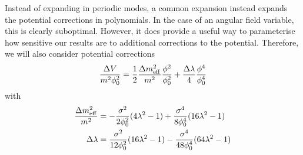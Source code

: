 \documentclass{revtex4}
\begin{document}
Instead of expanding in periodic modes, a common expansion instead expands the potential corrections in polynomials.
In the case of an angular field variable, this is clearly suboptimal.
However, it does provide a useful way to parameterise how sensitive our results are to additional corrections to the potential.
Therefore, we will also consider potential corrections
\begin{equation}
  \frac{\Delta V}{m^2\phi_0^2} = \frac{1}{2}\frac{\Delta m^2_{\rm eff}}{m^2}\frac{\phi^2}{\phi_0^2} + \frac{\Delta\lambda}{4}\frac{\phi^4}{\phi_0^4}
\end{equation}
with
\begin{align}
  \frac{\Delta m^2_{\rm eff}}{m^2} &= -\frac{\sigma^2}{2\phi_0^2}(4\lambda^2-1) + \frac{\sigma^4}{8\phi_0^4}(16\lambda^2-1) \\
  \Delta\lambda &= \frac{\sigma^2}{12\phi_0^2}(16\lambda^2-1) - \frac{\sigma^4}{48\phi_0^4}(64\lambda^2-1)
\end{align}
\end{document}
